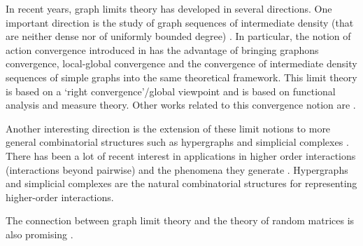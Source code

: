 \documentclass[11pt]{article}
\begin{document}
In recent years, graph limits theory has developed in several directions. One important direction is the study of graph sequences of intermediate density (that are neither dense nor of uniformly bounded degree) \cite{BORGS20081801,Lovsz2007SzemerdisLF, LOVASZ2006933,borgs2011convergentAnnals,MarkovSpaces,KUNSZENTIKOVACS20191,Kunszenti_Kov_cs_2022,frenkel2018convergence,backhausz2018action}. In particular, the notion of action convergence introduced in \cite{backhausz2018action} has the advantage of bringing graphons convergence, local-global convergence and the convergence of intermediate density sequences of simple graphs into the same theoretical framework. This limit theory is based on a `right convergence'/global viewpoint and is based on functional analysis and measure theory. Other works related to this convergence notion are \cite{ArankaAction2022,MeasTheorActionZucal,zucal2023action}.

Another interesting direction is the extension of these limit notions to more general combinatorial structures such as hypergraphs and simplicial complexes \cite{hypergrELEK20121731,HypergraphsSzegedy2,HypergraphonsZhao,zucal2023action}. There has been a lot of recent interest in applications in higher order interactions (interactions beyond pairwise) and the phenomena they generate \cite{HypergraphsNetworks,HigerOrdIntBook,carletti2020dynamical,majhi2022dynamics,MHJ,HypergraphsDynamics,Bohle_2021,JOST2019870,JostMulasBook}. Hypergraphs and simplicial complexes are the natural combinatorial structures for representing higher-order interactions.

The connection between graph limit theory and the theory of random matrices is also promising \cite{RandomMatricesGraphonsZhu,RandomMatrixGraphonmale2014,backhausz2018action}.
\end{document}
